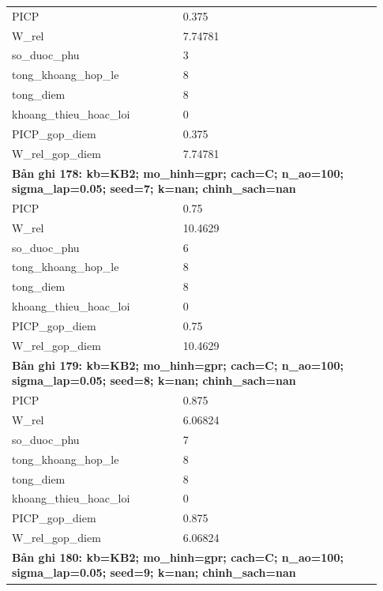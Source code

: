 \begin{longtable}{p{0.43\linewidth}p{0.50\linewidth}}
PICP & 0.375 \\
W\_\allowbreak rel & 7.74781 \\
so\_\allowbreak duoc\_\allowbreak phu & 3 \\
tong\_\allowbreak khoang\_\allowbreak hop\_\allowbreak le & 8 \\
tong\_\allowbreak diem & 8 \\
khoang\_\allowbreak thieu\_\allowbreak hoac\_\allowbreak loi & 0 \\
PICP\_\allowbreak gop\_\allowbreak diem & 0.375 \\
W\_\allowbreak rel\_\allowbreak gop\_\allowbreak diem & 7.74781 \\
\midrule
\multicolumn{2}{p{0.95\linewidth}}{\textbf{Bản ghi 178: kb=KB2; mo\_hinh=gpr; cach=C; n\_ao=100; sigma\_lap=0.05; seed=7; k=nan; chinh\_sach=nan}} \\
PICP & 0.75 \\
W\_\allowbreak rel & 10.4629 \\
so\_\allowbreak duoc\_\allowbreak phu & 6 \\
tong\_\allowbreak khoang\_\allowbreak hop\_\allowbreak le & 8 \\
tong\_\allowbreak diem & 8 \\
khoang\_\allowbreak thieu\_\allowbreak hoac\_\allowbreak loi & 0 \\
PICP\_\allowbreak gop\_\allowbreak diem & 0.75 \\
W\_\allowbreak rel\_\allowbreak gop\_\allowbreak diem & 10.4629 \\
\midrule
\multicolumn{2}{p{0.95\linewidth}}{\textbf{Bản ghi 179: kb=KB2; mo\_hinh=gpr; cach=C; n\_ao=100; sigma\_lap=0.05; seed=8; k=nan; chinh\_sach=nan}} \\
PICP & 0.875 \\
W\_\allowbreak rel & 6.06824 \\
so\_\allowbreak duoc\_\allowbreak phu & 7 \\
tong\_\allowbreak khoang\_\allowbreak hop\_\allowbreak le & 8 \\
tong\_\allowbreak diem & 8 \\
khoang\_\allowbreak thieu\_\allowbreak hoac\_\allowbreak loi & 0 \\
PICP\_\allowbreak gop\_\allowbreak diem & 0.875 \\
W\_\allowbreak rel\_\allowbreak gop\_\allowbreak diem & 6.06824 \\
\midrule
\multicolumn{2}{p{0.95\linewidth}}{\textbf{Bản ghi 180: kb=KB2; mo\_hinh=gpr; cach=C; n\_ao=100; sigma\_lap=0.05; seed=9; k=nan; chinh\_sach=nan}} \\

\end{longtable}
